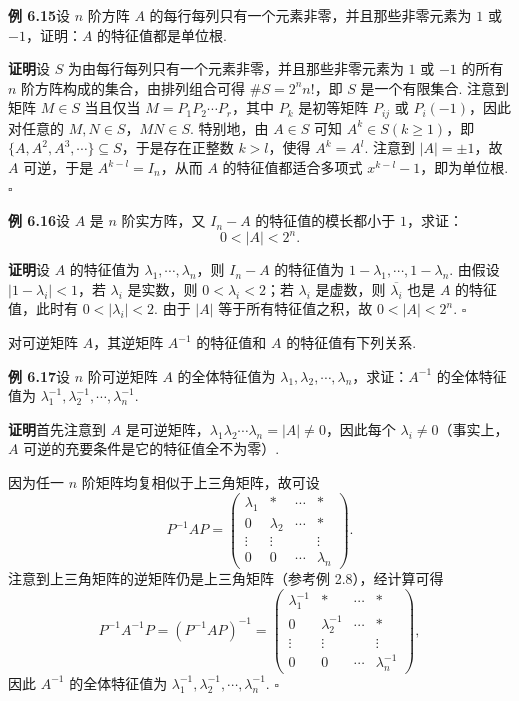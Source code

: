 \documentclass[UTF8, 12pt, fontset=fandol, oneside]{ctexart}
\begin{document}
\noindent\textbf{例 6.15}\quad 设 $n$ 阶方阵 $A$ 的每行每列只有一个元素非零，并且那些非零元素为 $1$ 或 $-1$，证明：$A$ 的特征值都是单位根.

\noindent\textbf{证明}\quad 设 $S$ 为由每行每列只有一个元素非零，并且那些非零元素为 $1$ 或 $-1$ 的所有 $n$ 阶方阵构成的集合，由排列组合可得 $\#S=2^n n!$，即 $S$ 是一个有限集合. 注意到矩阵 $M\in S$ 当且仅当 $M=P_1P_2\cdots P_r$，其中 $P_k$ 是初等矩阵 $P_{ij}$ 或 $P_i(-1)$，因此对任意的 $M,N\in S$，$MN\in S$. 特别地，由 $A\in S$ 可知 $A^k\in S(k\ge 1)$，即 $\{A,A^2,A^3,\cdots\}\subseteq S$，于是存在正整数 $k>l$，使得 $A^k=A^l$. 注意到 $|A|=\pm 1$，故 $A$ 可逆，于是 $A^{k-l}=I_n$，从而 $A$ 的特征值都适合多项式 $x^{k-l}-1$，即为单位根. $\square$

\noindent\textbf{例 6.16}\quad 设 $A$ 是 $n$ 阶实方阵，又 $I_n-A$ 的特征值的模长都小于 $1$，求证：
\[
0<|A|<2^n.
\]

\noindent\textbf{证明}\quad 设 $A$ 的特征值为 $\lambda_1,\cdots,\lambda_n$，则 $I_n-A$ 的特征值为 $1-\lambda_1,\cdots,1-\lambda_n$. 由假设 $|1-\lambda_i|<1$，若 $\lambda_i$ 是实数，则 $0<\lambda_i<2$；若 $\lambda_i$ 是虚数，则 $\overline{\lambda_i}$ 也是 $A$ 的特征值，此时有 $0<|\lambda_i|<2$. 由于 $|A|$ 等于所有特征值之积，故 $0<|A|<2^n$. $\square$

对可逆矩阵 $A$，其逆矩阵 $A^{-1}$ 的特征值和 $A$ 的特征值有下列关系.

\noindent\textbf{例 6.17}\quad 设 $n$ 阶可逆矩阵 $A$ 的全体特征值为 $\lambda_1,\lambda_2,\cdots,\lambda_n$，求证：$A^{-1}$ 的全体特征值为 $\lambda_1^{-1},\lambda_2^{-1},\cdots,\lambda_n^{-1}$.

\noindent\textbf{证明}\quad 首先注意到 $A$ 是可逆矩阵，$\lambda_1\lambda_2\cdots\lambda_n=|A|\ne 0$，因此每个 $\lambda_i\ne 0$（事实上，$A$ 可逆的充要条件是它的特征值全不为零）.

因为任一 $n$ 阶矩阵均复相似于上三角矩阵，故可设
\[
P^{-1}AP=\left(\begin{array}{cccc}
\lambda_1 & * & \cdots & *\\
0 & \lambda_2 & \cdots & *\\
\vdots & \vdots & & \vdots\\
0 & 0 & \cdots & \lambda_n
\end{array}\right).
\]
注意到上三角矩阵的逆矩阵仍是上三角矩阵（参考例 2.8），经计算可得
\[
P^{-1}A^{-1}P=(P^{-1}AP)^{-1}
=\left(\begin{array}{cccc}
\lambda_1^{-1} & * & \cdots & *\\
0 & \lambda_2^{-1} & \cdots & *\\
\vdots & \vdots & & \vdots\\
0 & 0 & \cdots & \lambda_n^{-1}
\end{array}\right),
\]
因此 $A^{-1}$ 的全体特征值为 $\lambda_1^{-1},\lambda_2^{-1},\cdots,\lambda_n^{-1}$. $\square$
\end{document}
